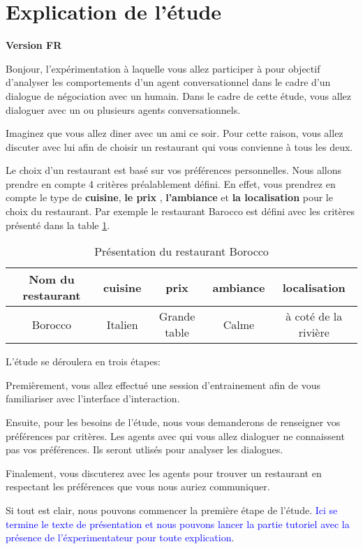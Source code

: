 \documentclass [french]{paper}
\begin{document}
		\section{Explication de l'étude}
			\textbf{ Version FR}


		Bonjour, l’expérimentation à laquelle vous allez participer à pour objectif d'analyser les comportements d’un agent conversationnel dans le cadre d’un dialogue de négociation avec un humain.
		Dans le cadre de cette étude, vous allez dialoguer avec un ou plusieurs agents conversationnels.
		
		Imaginez que vous allez diner avec un ami ce soir. Pour cette raison, vous allez discuter avec lui afin de choisir un restaurant qui vous convienne à tous les deux.
	
		Le choix d'un restaurant est basé sur vos préférences personnelles. Nous allons prendre en compte 4 critères préalablement défini. En effet, vous prendrez en compte le type de \textbf{cuisine}, \textbf{le prix} , \textbf{l'ambiance} et \textbf{la localisation} pour le choix du restaurant. Par exemple le restaurant Barocco est défini avec les critères présenté dans la table \ref{teb:ex}.
			\begin{table}[h]
			\begin{tabular} {|c|c|c|c|c|}
				\hline
				Nom du restaurant & cuisine & prix & ambiance& localisation \\
				\hline
				Borocco & Italien & Grande table & Calme & à coté de la rivière \\
				\hline 
			\end{tabular}
			\label{teb:ex}
			\caption{Présentation du restaurant Borocco}
		\end{table}
		
		L'étude se déroulera en trois étapes:
		
		Premièrement, vous allez effectué une session d'entrainement afin de vous familiariser avec l'interface d'interaction.
		
		Ensuite, pour les besoins de l'étude, nous vous demanderons de renseigner vos préférences par critères. Les agents avec qui vous allez dialoguer ne connaissent pas vos préférences. Ils seront utlisés pour analyser les dialogues.
		
		Finalement, vous discuterez avec les agents pour trouver un restaurant en respectant les préférences que vous nous auriez communiquer.
		
		Si tout est clair, nous pouvons commencer la première étape de l'étude.
		\textcolor{blue}{Ici se termine le texte de présentation et nous pouvons lancer la partie tutoriel avec la présence de l'éxperimentateur pour toute explication}.
		
\end{document}
